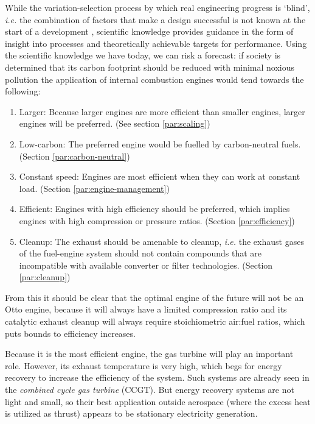 While the variation-selection process by which real engineering progress is
`blind', \textit{i.e.} the combination of factors that make a design successful
is not known at the start of a development \autocite{Vincenti1990}, scientific
knowledge provides guidance in the form of insight into processes and
theoretically achievable targets for performance. Using the scientific knowledge
we have today, we can  risk a forecast: if society is determined that its carbon
footprint should be reduced with minimal noxious pollution the application of
internal combustion engines would tend towards the following:

\begin{enumerate}
  
  \item Larger: Because larger engines are more efficient than smaller engines,
  larger engines will be preferred. (See section \ref{par:scaling})
  
  \item Low-carbon: The preferred engine would be fuelled by carbon-neutral
  fuels. (Section \ref{par:carbon-neutral})
  
  \item Constant speed: Engines are most efficient when they can work at
  constant load. (Section \ref{par:engine-management})
  
  \item Efficient: Engines with high efficiency should be preferred, which
  implies engines with high compression or pressure ratios. (Section
  \ref{par:efficiency})
  
  \item Cleanup: The exhaust should be amenable to cleanup, \textit{i.e.} the
  exhaust gases of the fuel-engine system should not contain compounds that are
  incompatible with available converter or filter technologies. (Section
  \ref{par:cleanup})
     
\end{enumerate} 

From this it should be clear that the optimal engine of the future will not be
an Otto engine, because it will always have a limited compression ratio and its
catalytic exhaust cleanup will always require stoichiometric air:fuel ratios,
which puts bounds to efficiency increases.

Because it is the most efficient engine, the gas turbine will play an important
role. However, its exhaust temperature is very high, which begs for energy
recovery to increase the efficiency of the system. Such systems are already seen
in the \textit{combined cycle gas turbine} (CCGT). But energy recovery systems
are not light and small, so their best application outside aerospace (where the
excess heat is utilized as thrust) appears to be stationary electricity
generation.

